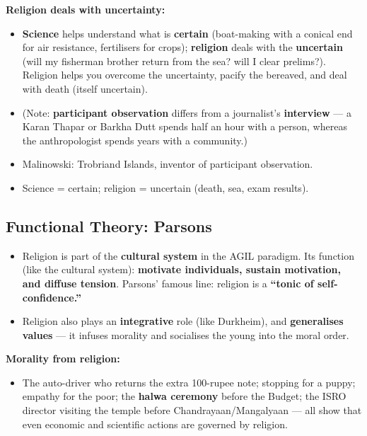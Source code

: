 \begin{KeyConcept}
\textbf{Religion deals with uncertainty:}
\begin{itemize}
\item \textbf{Science} helps understand what is \textbf{certain} (boat-making with a conical end for air resistance, fertilisers for crops); \textbf{religion} deals with the \textbf{uncertain} (will my fisherman brother return from the sea? will I clear prelims?). Religion helps you overcome the uncertainty, pacify the bereaved, and deal with death (itself uncertain).
\item (Note: \textbf{participant observation} differs from a journalist's \textbf{interview} --- a Karan Thapar or Barkha Dutt spends half an hour with a person, whereas the anthropologist spends years with a community.)
\end{itemize}
\end{KeyConcept}

\begin{QuickRevision}
\begin{itemize}
\item Malinowski: Trobriand Islands, inventor of participant observation.
\item Science = certain; religion = uncertain (death, sea, exam results).
\end{itemize}
\end{QuickRevision}

\sectiondivider

\subsection{Functional Theory: Parsons}

\begin{KeyConcept}
\begin{itemize}
\item Religion is part of the \textbf{cultural system} in the AGIL paradigm. Its function (like the cultural system): \textbf{motivate individuals, sustain motivation, and diffuse tension}. Parsons' famous line: religion is a \textbf{``tonic of self-confidence.''}
\item Religion also plays an \textbf{integrative} role (like Durkheim), and \textbf{generalises values} --- it infuses morality and socialises the young into the moral order.
\end{itemize}
\end{KeyConcept}

\begin{ExampleBox}
\textbf{Morality from religion:}
\begin{itemize}
\item The auto-driver who returns the extra 100-rupee note; stopping for a puppy; empathy for the poor; the \textbf{halwa ceremony} before the Budget; the ISRO director visiting the temple before Chandrayaan/Mangalyaan --- all show that even economic and scientific actions are governed by religion.
\end{itemize}
\end{ExampleBox}

